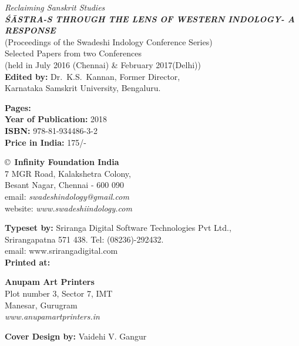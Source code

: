\thispagestyle{empty}
\noindent
{\fontsize{9}{11}\selectfont\sl Reclaiming Sanskrit Studies}\\
{\sl\bfseries ŚĀSTRA-S THROUGH THE LENS OF WESTERN INDOLOGY\newline - A RESPONSE}\\ 
(Proceedings of the Swadeshi Indology Conference Series)\\
Selected Papers from two Conferences\\ 
(held in July 2016 (Chennai) \& February 2017(Delhi))\\
{\bf Edited by:} Dr.\ K.S.\ Kannan, Former Director,\\ 
Karnataka Samskrit University, Bengaluru.
\vfill

\noindent
{\bf Pages:} \pageref{book:end}\\
{\bf Year of Publication:} 2018\\
{\bf ISBN:} 978-81-934486-3-2\\
{\bf Price in India:} 175/-
\vfill

\noindent
\copyright\ {\bf Infinity Foundation India}\\ 
7 MGR Road, Kalakshetra Colony,\\ 
Besant Nagar, Chennai - 600 090\\
email: {\sl swadeshindology@gmail.com}\\
website: {\sl www.swadeshiindology.com} 
\vfill

\noindent
{\bf Typeset by:} Sriranga Digital Software Technologies Pvt Ltd.,\\ 
Srirangapatna 571 438. Tel: (08236)-292432.\\
email: www.srirangadigital.com\\

\noindent
{\bf Printed at:} 

\noindent
{\bf Anupam Art Printers}\\
Plot number 3, Sector 7, IMT\\
Manesar, Gurugram\\
{\sl www.anupamartprinters.in}
\noindent

\bigskip

{\bf Cover Design by:} Vaidehi V. Gangur
